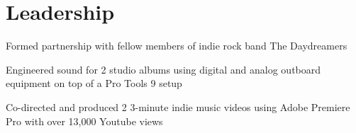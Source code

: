 \documentclass[letterpaper]{deedy-resume} %
\begin{document}
\begin{minipage}[t]{0.66\textwidth}
\section{Leadership}


\begin{tightitemize}
  \item Formed partnership with fellow members of indie rock band The Daydreamers
  \item Engineered sound for 2 studio albums using digital and analog outboard equipment on top of a Pro Tools 9 setup
  \item Co-directed and produced 2 3-minute indie music videos using Adobe Premiere Pro with over 13,000 Youtube views
\end{tightitemize}

\sectionspace %









\end{minipage}
\end{document}
